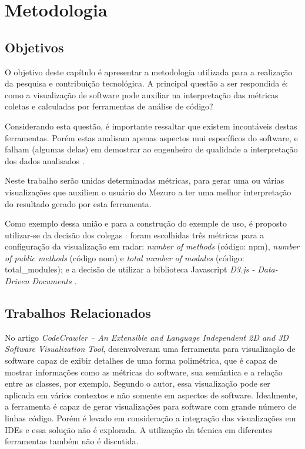 \chapter{Metodologia}\label{metodologia}

\section{Objetivos}

O objetivo deste capítulo é apresentar a metodologia utilizada para a
realização da pesquisa e contribuição tecnológica. A principal questão
a ser respondida é: como a visualização de software pode auxiliar na
interpretação das métricas coletas e calculadas por ferramentas de análise
de código?

Considerando esta questão, é importante ressaltar que existem incontáveis
destas ferramentas. Porém estas analisam apenas aspectos mui específicos
do software, e falham (algumas delas) em demostrar ao engenheiro de
qualidade a interpretação dos dados analisados \cite{deissenboeck2011quamoco}.

Neste trabalho serão unidas determinadas métricas, para gerar uma ou várias
visualizações que auxiliem o usuário do Mezuro a ter uma melhor interpretação do
resultado gerado por esta ferramenta.

Como exemplo dessa união e para a construção do exemple de uso, é proposto
utilizar-se da decisão dos colegas :
foram escolhidas três métricas para a configuração da visualização em
radar: \textit{number of methods} (código: npm), \textit{number of public
methods} (código nom) e \textit{total number of modules} (código:
total\_modules); e a decisão de utilizar a biblioteca Javascript \textit{D3.js -
Data-Driven Documents} \cite{filgueiras2014mezuro}.

\section{Trabalhos Relacionados}

No artigo \textit{CodeCrawler – An Extensible and Language Independent 2D and
3D Software Visualization Tool}, 
desenvolveram uma ferramenta para visualização de software capaz de exibir
detalhes de uma forma polimétrica, que é capaz de mostrar informações como as
métricas do software, sua semântica e a relação entre as classes, por exemplo.
Segundo o autor, essa visualização pode ser aplicada em vários contextos e não
somente em aspectos de software. Idealmente, a ferramenta é capaz de gerar
visualizações para software com grande número de linhas código. Porém é levado
em consideração a integração das visualizações em IDEs e essa solução não é
explorada. A utilização da técnica em diferentes ferramentas também não é
discutida.

